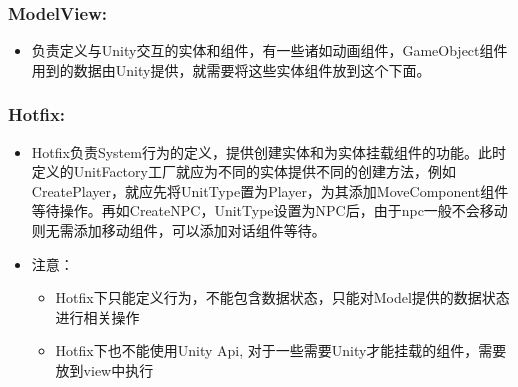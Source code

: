 \documentclass[9pt, b5paper]{article}
\begin{document}
\subsubsection{ModelView:}
\label{sec-8-12-2}
\begin{itemize}
\item 负责定义与Unity交互的实体和组件，有一些诸如动画组件，GameObject组件用到的数据由Unity提供，就需要将这些实体组件放到这个下面。
\end{itemize}
\subsubsection{Hotfix:}
\label{sec-8-12-3}
\begin{itemize}
\item Hotfix负责System行为的定义，提供创建实体和为实体挂载组件的功能。此时定义的UnitFactory工厂就应为不同的实体提供不同的创建方法，例如CreatePlayer，就应先将UnitType置为Player，为其添加MoveComponent组件等待操作。再如CreateNPC，UnitType设置为NPC后，由于npc一般不会移动则无需添加移动组件，可以添加对话组件等待。
\item 注意：
\begin{itemize}
\item Hotfix下只能定义行为，不能包含数据状态，只能对Model提供的数据状态进行相关操作
\item Hotfix下也不能使用Unity Api, 对于一些需要Unity才能挂载的组件，需要放到view中执行
\end{itemize}
\end{itemize}
\end{document}
